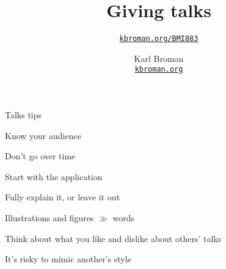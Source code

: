 \documentclass[aspectratio=169,12pt,t]{beamer}
\title{Giving talks}
\subtitle{}
\author{\href{https://kbroman.org/BMI883}{\tt kbroman.org/BMI883} }
\institute{}
\date{\small \hspace{3in} Karl Broman \\
  \hspace{3in} \href{https://kbroman.org}{\color{foreground}
    \small \tt kbroman.org}}
\begin{document}
{

\begin{frame}{Talks tips}

  \bi
\item Know your audience
\item Don't go over time
\item Start with the application
\item Fully explain it, or leave it out
\item Illustrations and figures $\gg$ words
\item Think about what you like and dislike about others' talks
\item It's risky to mimic another's style
  \ei

\end{frame}
}
\end{document}
